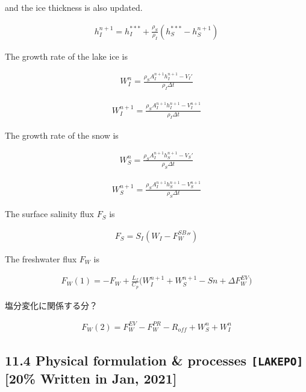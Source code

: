 and the ice thickness is also updated.

\begin{eqnarray}
    h_I^{n+1} = h_I^{*** } + \frac{\rho_S}{\rho_I} (h_S^{*** }-h_S^{n+1})
\end{eqnarray}

The growth rate of the lake ice is

\begin{eqnarray}
    W_I^n = \frac{\rho_S A_I^{n+1}h_I^{n+1} - V_I'}{\rho_I \Delta t}
\end{eqnarray}

\begin{eqnarray}
    W_I^{n+1} = \frac{\rho_S A_I^{n+1}h_I^{n+1} - V_I^{n+1}}{\rho_I \Delta t}
\end{eqnarray}

The growth rate of the snow is

\begin{eqnarray}
    W_S^n =  \frac{\rho_S A_I^{n+1}h_S^{n+1} - V_S'}{\rho_S \Delta t}
\end{eqnarray}

\begin{eqnarray}
    W_S^{n+1} =  \frac{\rho_S A_I^{n+1}h_S^{n+1} - V_S^{n+1}}{\rho_S \Delta t}
\end{eqnarray}

The surface salinity flux \(F_S\) is

\begin{eqnarray}
    F_S = S_I(W_I-F_W^{SB}{''})
\end{eqnarray}

The freshwater flux \(F_W\) is

\begin{eqnarray}
    F_W(1) = - F_W + \frac{L_f}{C_p} \Big(W_I^{n+1}+W_S^{n+1}-Sn + \Delta F_W^{EV}\Big)
\end{eqnarray}

塩分変化に関係する分？

\begin{eqnarray}
    F_W(2) =F_W^{EV} - F_W^{PR} - R_{off} + W_S^n + W_I^n
\end{eqnarray}

\hypertarget{physical-formulation-processes-lakepo-20-written-in-jan-2021}{%
\subsection{\texorpdfstring{11.4 Physical formulation \& processes
\texttt{{[}LAKEPO{]}} {[}20\% Written in Jan,
2021{]}}{11.4 Physical formulation \& processes {[}LAKEPO{]} {[}20\% Written in Jan, 2021{]}}}\label{physical-formulation-processes-lakepo-20-written-in-jan-2021}}

